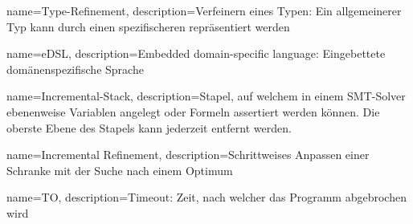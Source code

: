 {
    name=Type-Refinement,
    description={Verfeinern eines Typen: Ein allgemeinerer Typ kann durch einen spezifischeren repräsentiert werden}
}

{
    name=eDSL,
    description={Embedded domain-specific language: Eingebettete domänenspezifische Sprache}
}

{
    name=Incremental-Stack,
    description={Stapel, auf welchem in einem SMT-Solver ebenenweise Variablen angelegt oder Formeln assertiert werden können. Die oberste Ebene des Stapels kann jederzeit entfernt werden.}
}

{
    name=Incremental Refinement,
    description={Schrittweises Anpassen einer Schranke mit der Suche nach einem Optimum}
}

{
    name=TO,
    description={Timeout: Zeit, nach welcher das Programm abgebrochen wird}
}